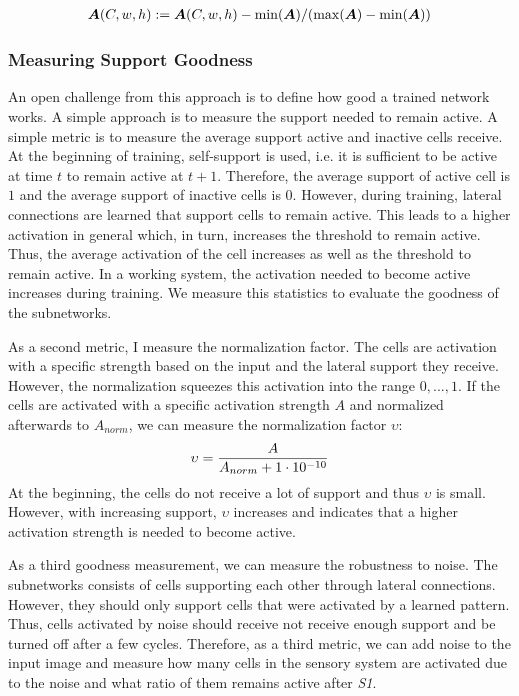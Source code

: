 \begin{align}\eqlbl{norm_lat3}
	\boldsymbol{A}(C,w,h) :=  \boldsymbol{A}(C,w,h)  - \min(\boldsymbol{A}) / (\max(\boldsymbol{A}) - \min(\boldsymbol{A}))
\end{align}


\subsubsection{Measuring Support Goodness}
An open challenge from this approach is to define how good a trained network works.
A simple approach is to measure the support needed to remain active.
A simple metric is to measure the average support active and inactive cells receive.
At the beginning of training, self-support is used, i.e. it is sufficient to be active at time $t$ to remain active at $t+1$.
Therefore, the average support of active cell is $1$ and the average support of inactive cells is $0$.
However, during training, lateral connections are learned that support cells to remain active.
This leads to a higher activation in general which, in turn, increases the threshold to remain active.
Thus, the average activation of the cell increases as well as the threshold to remain active.
In a working system, the activation needed to become active increases during training.
We measure this statistics to evaluate the goodness of the subnetworks.

As a second metric, I measure the normalization factor.
The cells are activation with a specific strength based on the input and the lateral support they receive.
However, the normalization squeezes this activation into the range $0, ..., 1$.
If the cells are activated with a specific activation strength $A$ and normalized afterwards to $A_{norm}$, we can measure the normalization factor 
$\upsilon$:
\begin{align}\eqlbl{goodness_lat}
	\upsilon = \frac{A}{A_{norm}+1\cdot10^{-10}}
\end{align}
At the beginning, the cells do not receive a lot of support and thus $\upsilon$ is small. However, with increasing support, $\upsilon$ increases and indicates that a higher activation strength is needed to become active.

As a third goodness measurement, we can measure the robustness to noise.
The subnetworks consists of cells supporting each other through lateral connections. However, they should only support cells that were activated by a learned pattern. Thus, cells activated by noise should receive not receive enough support and be turned off after a few cycles.
Therefore, as a third metric, we can add noise to the input image and measure how many cells  in the sensory system are activated due to the noise and what ratio of them remains active after \emph{S1}.





